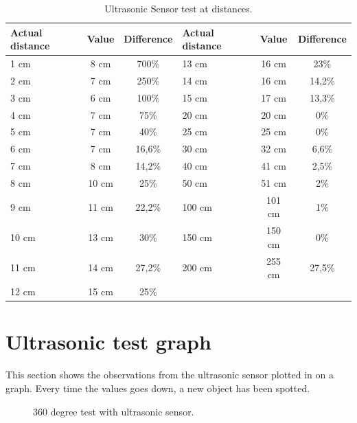 \begin{table}[H]
	\centering
    \begin{tabular}{|lcc|lcc|}
    \hline  
    \rowcolor{DGray}
    \textbf{Actual distance} & \textbf{Value}  & \textbf{Difference} &\textbf{Actual distance} & \textbf{Value}  & \textbf{Difference}\\ \hline
    1 cm     & 8 cm     & 700\%  &    13 cm     & 16 cm     & 23\% \\
    2 cm     & 7 cm     & 250\%  &    14 cm     & 16 cm     & 14,2\% \\
    3 cm     & 6 cm     & 100\%  &    15 cm     & 17 cm     & 13,3\% \\
    4 cm     & 7 cm     & 75\%   &    20 cm     & 20 cm     & 0\% \\
    5 cm     & 7 cm     & 40\%   &    25 cm     & 25 cm     & 0\% \\
    6 cm     & 7 cm     & 16,6\% &    30 cm     & 32 cm     & 6,6\% \\
    7 cm     & 8 cm     & 14,2\% &    40 cm     & 41 cm     & 2,5\% \\
    8 cm     & 10 cm    & 25\%   &    50 cm     & 51 cm     & 2\% \\
    9 cm     & 11 cm    & 22,2\% &    100 cm    & 101 cm    & 1\% \\
    10 cm    & 13 cm    & 30\%   &    150 cm    & 150 cm    & 0\% \\
    11 cm    & 14 cm    & 27,2\% &    200 cm    & 255 cm    & 27,5\% \\
    12 cm    & 15 cm    & 25\%   &              &           &\\
    \hline 
    \end{tabular}
    \caption{\label{table:app_ultrasonic_sensor_test} Ultrasonic Sensor test at distances.}
\end{table}



\section*{Ultrasonic test graph} \label{app:sonar-test-graph}
This section shows the observations from the ultrasonic sensor plotted in on a graph. Every time the values goes down, a new object has been spotted.

\begin{figure}[H]
     \caption{\label{fig:sonar-test-graph} 360 degree test with ultrasonic sensor.}
\end{figure}
